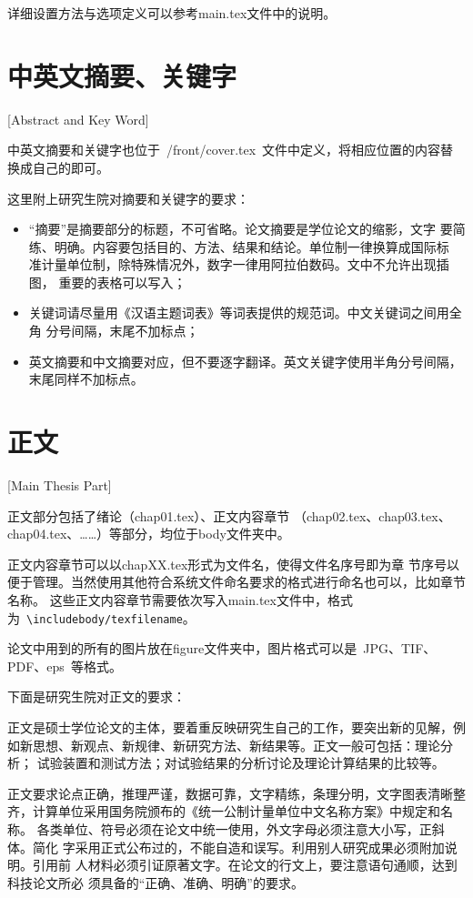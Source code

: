 详细设置方法与选项定义可以参考main.tex文件中的说明。

\section{中英文摘要、关键字}[Abstract and Key Word]

中英文摘要和关键字也位于~{/front/cover.tex}~文件中定义，将相应位置的内容替换成自己的即可。

这里附上研究生院对摘要和关键字的要求：
\begin{itemize}
  \item “摘要”是摘要部分的标题，不可省略。论文摘要是学位论文的缩影，文字
        要简练、明确。内容要包括目的、方法、结果和结论。单位制一律换算成国际标
        准计量单位制，除特殊情况外，数字一律用阿拉伯数码。文中不允许出现插图，
        重要的表格可以写入；
  \item 关键词请尽量用《汉语主题词表》等词表提供的规范词。中文关键词之间用全角
        分号间隔，末尾不加标点；
  \item 英文摘要和中文摘要对应，但不要逐字翻译。英文关键字使用半角分号间隔，
        末尾同样不加标点。
\end{itemize}

\section{正文}[Main Thesis Part]

正文部分包括了绪论（chap01.tex）、正文内容章节
（chap02.tex、chap03.tex、chap04.tex、……）等部分，均位于body文件夹中。

正文内容章节可以以chapXX.tex形式为文件名，使得文件名序号即为章
节序号以便于管理。当然使用其他符合系统文件命名要求的格式进行命名也可以，比如章节名称。
这些正文内容章节需要依次写入main.tex文件中，格式
为~\texttt{\textbackslash include{body/texfilename}}。

论文中用到的所有的图片放在figure文件夹中，图片格式可以是~JPG、TIF、PDF、eps~等格式。

下面是研究生院对正文的要求：

正文是硕士学位论文的主体，要着重反映研究生自己的工作，要突出新的见解，例
如新思想、新观点、新规律、新研究方法、新结果等。正文一般可包括：理论分析；
试验装置和测试方法；对试验结果的分析讨论及理论计算结果的比较等。

正文要求论点正确，推理严谨，数据可靠，文字精练，条理分明，文字图表清晰整
齐，计算单位采用国务院颁布的《统一公制计量单位中文名称方案》中规定和名称。
各类单位、符号必须在论文中统一使用，外文字母必须注意大小写，正斜体。简化
字采用正式公布过的，不能自造和误写。利用别人研究成果必须附加说明。引用前
人材料必须引证原著文字。在论文的行文上，要注意语句通顺，达到科技论文所必
须具备的“正确、准确、明确”的要求。

